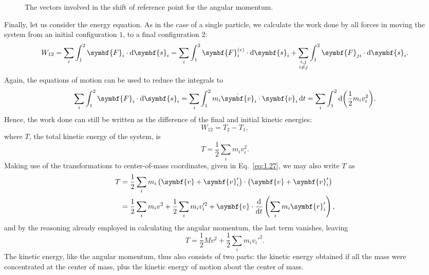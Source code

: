 \begin{figure}[htbp]
    \centering
    \caption{The vectors involved in the shift of reference point for the angular momentum.}
    \label{fig:1.3}
\end{figure}

Finally, let us consider the energy equation. As in the case of a single particle, we calculate the work done by all forces in moving the system from an initial configuration \(1\), to a final configuration \(2\):
\begin{equation}
    W_{12}=\sum_i\int_1^2\symbf{F}_i\cdot\odif{\symbf{s}_i}=\sum_i\int_1^2\symbf{F}_i^{\left(e\right)}\cdot\odif{\symbf{s}_i}+\sum_{\substack{i,j\\i\ne j}}\int_1^2\symbf{F}_{ji}\cdot\odif{\symbf{s}_i}.\label{eq:1.29}
\end{equation}
Again, the equations of motion can be used to reduce the integrals to
\begin{equation*}
    \sum_i\int_1^2\symbf{F}_i\cdot\odif{\symbf{s}_i}=\sum_i\int_1^2m_i\dot{\symbf{v}}_i\cdot\symbf{v}_i\odif{t}=\sum_i\int_1^2\odif{\left(\frac{1}{2}m_iv_i^2\right)}.
\end{equation*}
Hence, the work done can still be written as the difference of the final and initial kinetic energies:
\begin{equation*}
    W_{12}=T_2-T_1,
\end{equation*}
where \(T\), the total kinetic energy of the system, is
\begin{equation}
    T=\frac{1}{2}\sum_im_iv_i^2.
\end{equation}
Making use of the transformations to center-of-mass coordinates, given in Eq.~\eqref{eq:1.27}, we may also write \(T\) as
\begin{align*}
    T&=\frac{1}{2}\sum_im_i\left(\symbf{v}+\symbf{v}_i'\right)\cdot\left(\symbf{v}+\symbf{v}_i'\right)\\
    &=\frac{1}{2}\sum_im_iv^2+\frac{1}{2}\sum_im_iv_i'^2+\symbf{v}\cdot\odv*{\left(\sum_im_i\symbf{r}_i'\right)}{t},
\end{align*}
and by the reasoning already employed in calculating the angular momentum, the last term vanishes, leaving 
\begin{equation}
    T=\frac{1}{2}Mv^2+\frac{1}{2}\sum_im_iv_i'^2.
\end{equation}
The kinetic energy, like the angular momentum, thus also consists of two parts: the kinetic energy obtained if all the mass were concentrated at the center of mass, plus the kinetic energy of motion about the center of mass.

